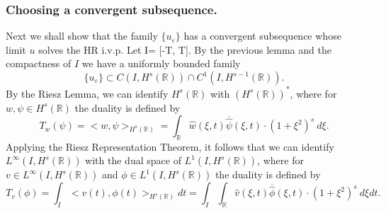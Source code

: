 \documentclass{beamer}
\newcommand{\rr}{\mathbb{R}}
\newcommand{\ee}{\varepsilon}
\begin{document}
\begin{frame}
\frametitle{Choosing  a convergent subsequence.}
%
Next we shall show that the family $\{ u_\ee\}$ has a convergent 
subsequence
whose limit $u$ solves the HR i.v.p.  Let I= [-T, T]. By the previous lemma and the compactness of $I$ we have a uniformly bounded 
family
%
%
%
\begin{equation*}
\label{Lip-1-fam}
\{u_\ee\}\subset C(I, H^s(\rr))\cap C^1(I,
H^{s-1}(\rr)).
\end{equation*}
%
%
%
%
By the Riesz Lemma, we can identify $H^s(\rr)$ with
$(H^s(\rr))^*$, where for $w, \psi \in H^s(\rr)$ the duality is
defined by 
\begin{equation*}
T_w(\psi) = <w, \psi>_{H^s(\rr)} = \int_{\rr}
\widehat{w}(\xi, t) \overline{\widehat{\psi}}(\xi, t) \cdot (1
+ \xi^2)^s \ d \xi.
\end{equation*}
Applying the Riesz Representation Theorem, it follows that we 
can identify $L^\infty(I, H^s(\rr)) $ with the dual space of $L^1(I,
H^{s}(\rr))$, where for $v\in L^\infty(I, H^s(\rr)) $ and $ \phi \in
L^1(I, H^{s}(\rr))$ the duality is defined by  
%
%
%
\begin{equation*}
T_v(\phi) = \int_I <v (t), \phi (t)>_{H^s(\rr)} dt  = \int_I
\int_{\rr}
\widehat{v}(\xi, t) \overline{\widehat{\phi}}(\xi, t) \cdot (1
+ \xi^2)^s \ d \xi dt.
\end{equation*}
%
%
%
\end{frame}
\end{document}
